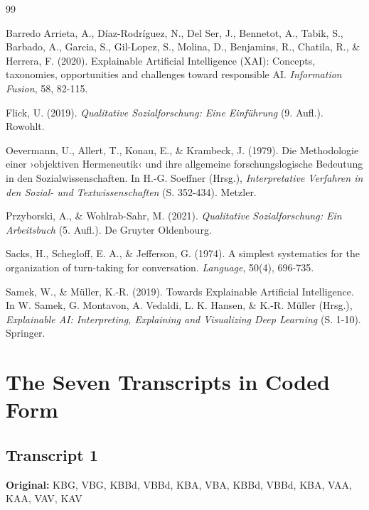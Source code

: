 \documentclass[
  12pt,
  a4paper,
  oneside,
  titlepage
]{article}
\begin{document}
\newpage
\begin{thebibliography}{99}

Barredo Arrieta, A., Díaz-Rodríguez, N., Del Ser, J., Bennetot, A., Tabik, S., 
Barbado, A., Garcia, S., Gil-Lopez, S., Molina, D., Benjamins, R., Chatila, R., 
\& Herrera, F. (2020). Explainable Artificial Intelligence (XAI): Concepts, 
taxonomies, opportunities and challenges toward responsible AI. 
\textit{Information Fusion}, 58, 82-115.

Flick, U. (2019). \textit{Qualitative Sozialforschung: Eine Einführung} (9. Aufl.). 
Rowohlt.

Oevermann, U., Allert, T., Konau, E., \& Krambeck, J. (1979). Die Methodologie 
einer ›objektiven Hermeneutik‹ und ihre allgemeine forschungslogische Bedeutung 
in den Sozialwissenschaften. In H.-G. Soeffner (Hrsg.), \textit{Interpretative 
Verfahren in den Sozial- und Textwissenschaften} (S. 352-434). Metzler.

Przyborski, A., \& Wohlrab-Sahr, M. (2021). \textit{Qualitative Sozialforschung: 
Ein Arbeitsbuch} (5. Aufl.). De Gruyter Oldenbourg.

Sacks, H., Schegloff, E. A., \& Jefferson, G. (1974). A simplest systematics for 
the organization of turn-taking for conversation. \textit{Language}, 50(4), 696-735.

Samek, W., \& Müller, K.-R. (2019). Towards Explainable Artificial Intelligence. 
In W. Samek, G. Montavon, A. Vedaldi, L. K. Hansen, \& K.-R. Müller (Hrsg.), 
\textit{Explainable AI: Interpreting, Explaining and Visualizing Deep Learning} 
(S. 1-10). Springer.

\end{thebibliography}

\newpage
\appendix
\section{The Seven Transcripts in Coded Form}

\subsection{Transcript 1}
\textbf{Original:} KBG, VBG, KBBd, VBBd, KBA, VBA, KBBd, VBBd, KBA, VAA, KAA, VAV, KAV
\end{document}
